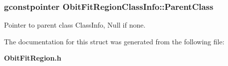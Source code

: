 \subsubsection{\setlength{\rightskip}{0pt plus 5cm}gconstpointer {\bf Obit\-Fit\-Region\-Class\-Info::Parent\-Class}}\label{structObitFitRegionClassInfo_o3}


Pointer to parent class Class\-Info, Null if none. 



The documentation for this struct was generated from the following file:\begin{CompactItemize}
\item 
{\bf Obit\-Fit\-Region.h}\end{CompactItemize}
